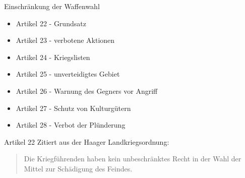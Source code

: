 \documentclass{beamer}
\begin{document}
\begin{frame}{Einschränkung der Waffenwahl}
    \begin{itemize}
        \item Artikel 22 - Grundsatz
        \item Artikel 23 - verbotene Aktionen
        \item Artikel 24 - Kriegslisten
        \item Artikel 25 - unverteidigtes Gebiet
        \item Artikel 26 - Warnung des Gegners vor Angriff
        \item Artikel 27 - Schutz von Kulturgütern
        \item Artikel 28 - Verbot der Plünderung
    \end{itemize}
\end{frame}

\begin{frame}{Artikel 22}
    Zitiert aus der Haager Landkriegsordnung\cite{DeutschesReich2010}:
    \begin{quotation}
      Die Kriegführenden haben kein unbeschränktes Recht in der Wahl der Mittel zur Schädigung des Feindes.
    \end{quotation}
\end{frame}
\end{document}
